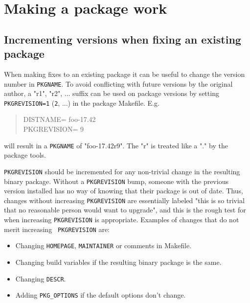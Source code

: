 %
%
%
%
%

\section{Making a package work} %
\label{section:fixing}

\subsection{Incrementing versions when fixing an existing package} %

When making fixes to an existing package it can be useful to change the version
number in {\tt PKGNAME}. To avoid conflicting with future versions by the
original author, a "r1", "r2", ... suffix can be used on package versions by
setting {\tt PKGREVISION=1} ({\tt 2}, ...) in the package Makefile. E.g.
\begin{quote}
   DISTNAME=             foo-17.42\\
   PKGREVISION=          9
\end{quote}
will result in a {\tt PKGNAME} of "foo-17.42r9". The "r" is treated like a "."
by the package tools.

{\tt PKGREVISION} should be incremented for any non-trivial change in the
resulting binary package. Without a {\tt PKGREVISION} bump, someone with the
previous version installed has no way of knowing that their package is out
of date. Thus, changes without increasing {\tt PKGREVISION} are essentially
labeled "this is so trivial that no reasonable person would want to
upgrade", and this is the rough test for when increasing {\tt PKGREVISION}
is appropriate. Examples of changes that do not merit increasing {\tt
PKGREVISION} are:
\begin{itemize}
   \item Changing {\tt HOMEPAGE}, {\tt MAINTAINER} or comments in Makefile.
   \item Changing build variables if the resulting binary package is the same.
   \item Changing {\tt DESCR}.
   \item Adding {\tt PKG\_OPTIONS} if the default options don't change.
\end{itemize}

